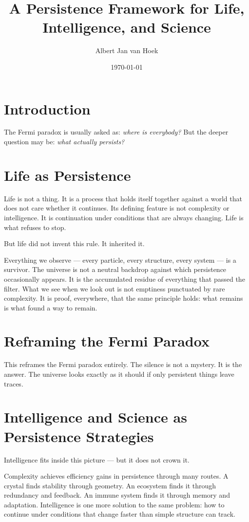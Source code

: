 \documentclass{article}
\title{A Persistence Framework for Life, Intelligence, and Science}
\author{Albert Jan van Hoek}
\date{\today}
\begin{document}
\maketitle

\section*{Introduction}
The Fermi paradox is usually asked as: \textit{where is everybody?} But the deeper question may be: \textit{what actually persists?}

\section*{Life as Persistence}
Life is not a thing. It is a process that holds itself together against a world that does not care whether it continues. Its defining feature is not complexity or intelligence. It is continuation under conditions that are always changing. Life is what refuses to stop.

But life did not invent this rule. It inherited it.

Everything we observe --- every particle, every structure, every system --- is a survivor. The universe is not a neutral backdrop against which persistence occasionally appears. It is the accumulated residue of everything that passed the filter. What we see when we look out is not emptiness punctuated by rare complexity. It is proof, everywhere, that the same principle holds: what remains is what found a way to remain.

\section*{Reframing the Fermi Paradox}
This reframes the Fermi paradox entirely. The silence is not a mystery. It is the answer. The universe looks exactly as it should if only persistent things leave traces.

\section*{Intelligence and Science as Persistence Strategies}
Intelligence fits inside this picture --- but it does not crown it.

Complexity achieves efficiency gains in persistence through many routes. A crystal finds stability through geometry. An ecosystem finds it through redundancy and feedback. An immune system finds it through memory and adaptation. Intelligence is one more solution to the same problem: how to continue under conditions that change faster than simple structure can track.
\end{document}
